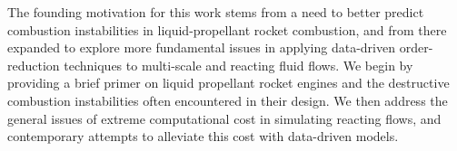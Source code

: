 The founding motivation for this work stems from a need to better predict combustion instabilities in liquid-propellant rocket combustion, and from there expanded to explore more fundamental issues in applying data-driven order-reduction techniques to multi-scale and reacting fluid flows. We begin by providing a brief primer on liquid propellant rocket engines and the destructive combustion instabilities often encountered in their design. We then address the general issues of extreme computational cost in simulating reacting flows, and contemporary attempts to alleviate this cost with data-driven models.
